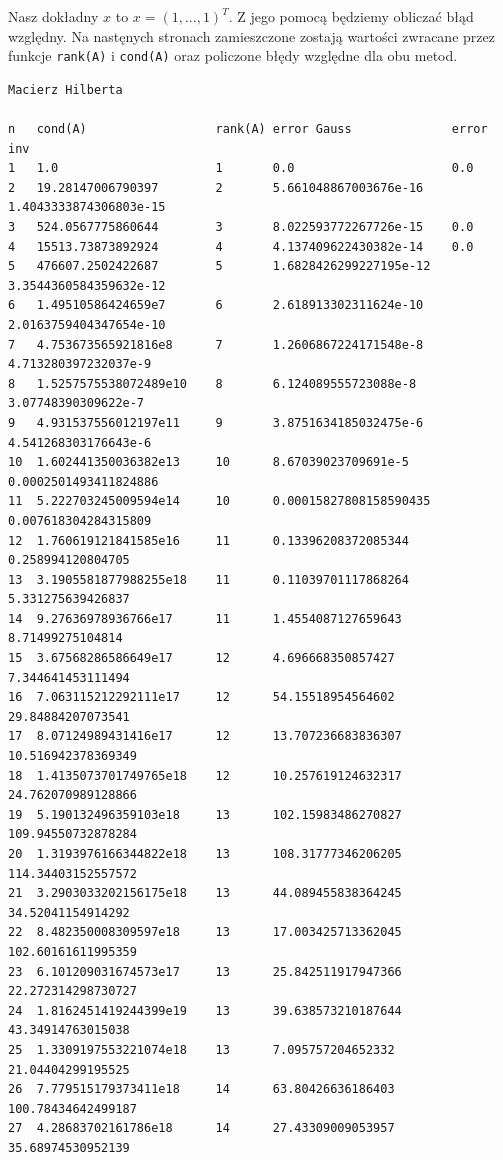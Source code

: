 \documentclass{article}
\begin{document}
\noindent Nasz dokładny $x$ to $x = (1, ..., 1)^T$. Z jego pomocą będziemy obliczać błąd względny. Na nastęnych stronach zamieszczone zostają wartości zwracane przez funkcje \texttt{rank(A)} i \texttt{cond(A)} oraz policzone błędy względne dla obu metod.
\newpage
\begin{verbatim}
Macierz Hilberta

n   cond(A)                  rank(A) error Gauss              error inv
1   1.0                      1       0.0                      0.0
2   19.28147006790397        2       5.661048867003676e-16    1.4043333874306803e-15   
3   524.0567775860644        3       8.022593772267726e-15    0.0
4   15513.73873892924        4       4.137409622430382e-14    0.0
5   476607.2502422687        5       1.6828426299227195e-12   3.3544360584359632e-12   
6   1.49510586424659e7       6       2.618913302311624e-10    2.0163759404347654e-10   
7   4.753673565921816e8      7       1.2606867224171548e-8    4.713280397232037e-9
8   1.5257575538072489e10    8       6.124089555723088e-8     3.07748390309622e-7
9   4.931537556012197e11     9       3.8751634185032475e-6    4.541268303176643e-6
10  1.602441350036382e13     10      8.67039023709691e-5      0.0002501493411824886
11  5.222703245009594e14     10      0.00015827808158590435   0.007618304284315809
12  1.760619121841585e16     11      0.13396208372085344      0.258994120804705
13  3.1905581877988255e18    11      0.11039701117868264      5.331275639426837
14  9.27636978936766e17      11      1.4554087127659643       8.71499275104814
15  3.67568286586649e17      12      4.696668350857427        7.344641453111494
16  7.063115212292111e17     12      54.15518954564602        29.84884207073541
17  8.07124989431416e17      12      13.707236683836307       10.516942378369349
18  1.4135073701749765e18    12      10.257619124632317       24.762070989128866
19  5.190132496359103e18     13      102.15983486270827       109.94550732878284
20  1.3193976166344822e18    13      108.31777346206205       114.34403152557572
21  3.2903033202156175e18    13      44.089455838364245       34.52041154914292
22  8.482350008309597e18     13      17.003425713362045       102.60161611995359
23  6.101209031674573e17     13      25.842511917947366       22.272314298730727
24  1.8162451419244399e19    13      39.638573210187644       43.34914763015038
25  1.3309197553221074e18    13      7.095757204652332        21.04404299195525
26  7.779515179373411e18     14      63.80426636186403        100.78434642499187       
27  4.28683702161786e18      14      27.43309009053957        35.68974530952139

\end{verbatim}
\end{document}
